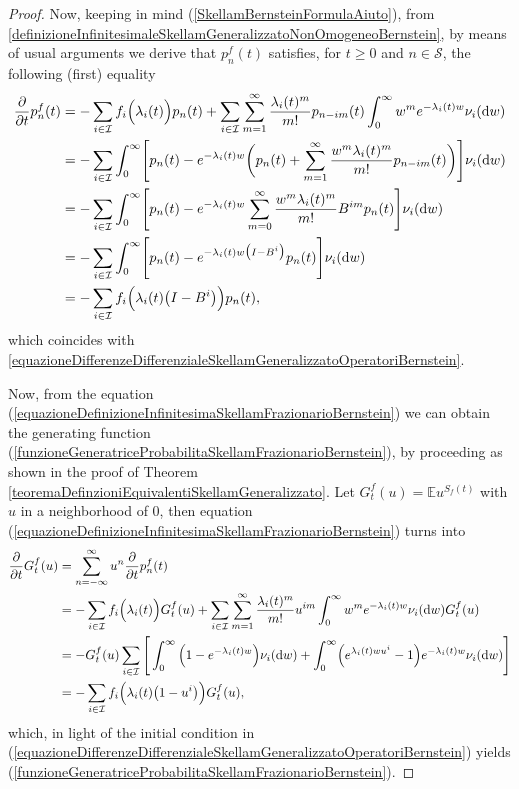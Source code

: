 \documentclass[12pt, twoside, english, headsepline]{article}
\newcommand*\dif{\mathop{}\!\mathrm{d}}  %
\theoremstyle{definition} %
\numberwithin{equation}{section} %
\begin{document}
\begin{proof}
Now, keeping in mind (\ref{SkellamBernsteinFormulaAiuto}), from \eqref{definizioneInfinitesimaleSkellamGeneralizzatoNonOmogeneoBernstein}, by means of usual arguments we derive that $p_n^f(t)$ satisfies, for $t\ge0$ and $n\in\mathcal{S}$, the following (first) equality
\begin{align}
 \frac{\partial }{\partial t} p_n^f(t)&= -\sum_{i\in\mathcal{I}} f_i\Big(\lambda_i(t)\Big)p_n(t) + \sum_{i\in\mathcal{I}} \sum_{m=1}^\infty \frac{\lambda_i(t)^m}{m!} p_{n-im}(t) \int_0^\infty w^m e^{-\lambda_i(t)w}\nu_i(\dif w) \label{equazioneDefinizioneInfinitesimaSkellamFrazionarioBernstein}\\
& =  -\sum_{i\in\mathcal{I}} \int_0^\infty \Biggl[ p_n(t) -e^{-\lambda_i(t)w}\biggl( p_n(t) + \sum_{m=1}^\infty \frac{w^m\lambda_i(t)^m}{m!} p_{n-im}(t)\biggr) \Biggr]\nu_i(\dif w) \nonumber\\
& = -\sum_{i\in\mathcal{I}} \int_0^\infty \Biggl[ p_n(t) - e^{-\lambda_i(t)w} \sum_{m=0}^\infty  \frac{w^m\lambda_i(t)^m}{m!} B^{im} p_{n}(t)\Bigg] \nu_i(\dif w)\nonumber\\
& = -\sum_{i\in\mathcal{I}} \int_0^\infty \Biggl[ p_n(t) - e^{-\lambda_i(t)w\big(I-B^i\big)} p_{n}(t)\Bigg] \nu_i(\dif w)\nonumber\\
& = -\sum_{i\in\mathcal{I}} f_i\Bigl( \lambda_i(t)\big(I-B^i\big) \Bigr)p_n(t),\nonumber
\end{align}
which coincides with \eqref{equazioneDifferenzeDifferenzialeSkellamGeneralizzatoOperatoriBernstein}.

Now, from the equation (\ref{equazioneDefinizioneInfinitesimaSkellamFrazionarioBernstein}) we can obtain the generating function (\ref{funzioneGeneratriceProbabilitaSkellamFrazionarioBernstein}), by proceeding as shown in the proof of Theorem \ref{teoremaDefinzioniEquivalentiSkellamGeneralizzato}. Let $G^f_t(u) = \mathbb{E}u^{S_f(t)}$ with $u$ in a neighborhood of $0$, then equation (\ref{equazioneDefinizioneInfinitesimaSkellamFrazionarioBernstein}) turns into
\begin{align}
 \frac{\partial }{\partial t} G^f_t(u) &= \sum_{n=-\infty}^\infty u^n \frac{\partial }{\partial t} p_n^f(t)\nonumber\\
&= -\sum_{i\in\mathcal{I}}  f_i\Big(\lambda_i(t)\Big) G^f_t(u)+ \sum_{i\in\mathcal{I}} \sum_{m=1}^\infty \frac{\lambda_i(t)^m}{m!}u^{im} \int_0^\infty w^m e^{-\lambda_i(t)w}\nu_i(\dif w)G^f_t(u)\nonumber\\
&= -G^f_t(u)\sum_{i\in\mathcal{I}}\Bigg[ \int_0^\infty\Big(1-e^{-\lambda_i(t)w}\Big)\nu_i(\dif w) +  \int_0^\infty \Bigl(e^{\lambda_i(t)wu^i}-1\Big) e^{-\lambda_i(t)w}\nu_i(\dif w)\Bigg] \nonumber \\
& = -\sum_{i\in\mathcal{I}} f_i\Bigl( \lambda_i(t)\big(1-u^i\big) \Bigr)G^f_t(u),\nonumber
\end{align}
which, in light of the initial condition in (\ref{equazioneDifferenzeDifferenzialeSkellamGeneralizzatoOperatoriBernstein}) yields (\ref{funzioneGeneratriceProbabilitaSkellamFrazionarioBernstein}).
\end{proof}
\end{document}
